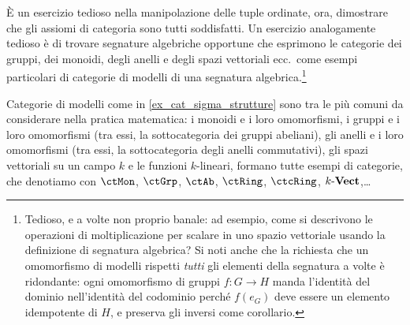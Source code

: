 \`E un esercizio tedioso nella manipolazione delle tuple ordinate, ora, dimostrare che gli assiomi di categoria sono tutti soddisfatti. Un esercizio analogamente tedioso è di trovare segnature algebriche opportune che esprimono le categorie dei gruppi, dei monoidi, degli anelli e degli spazi vettoriali ecc.\ come esempi particolari di categorie di modelli di una segnatura algebrica.\footnote{Tedioso, e a volte non proprio banale: ad esempio, come si descrivono le operazioni di moltiplicazione per scalare in uno spazio vettoriale usando la definizione di segnatura algebrica? Si noti anche che la richiesta che un omomorfismo di modelli rispetti \emph{tutti} gli elementi della segnatura a volte è ridondante: ogni omomorfismo di gruppi \(f : G\to H\) manda l'identità del dominio nell'identità del codominio perché \(f(e_G)\) deve essere un elemento idempotente di \(H\), e preserva gli inversi come corollario.}
\begin{remark}\label{varie_categorie_nella_pratica}
	Categorie di modelli come in \ref{ex_cat_sigma_strutture} sono tra le più comuni da considerare nella pratica matematica: i monoidi e i loro omomorfismi, i gruppi e i loro omomorfismi (tra essi, la sottocategoria dei gruppi abeliani), gli anelli e i loro omomorfismi (tra essi, la sottocategoria degli anelli commutativi), gli spazi vettoriali su un campo \(k\) e le funzioni \(k\)-lineari, formano tutte esempi di categorie, che denotiamo con \(\ctMon\), \(\ctGrp\), \(\ctAb\), \(\ctRing\), \(\ctcRing\), \(\ctVect[k]\),\dots
\end{remark}
